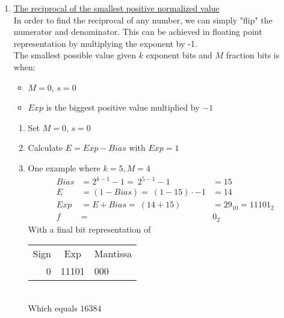 \documentclass{article}
\begin{document}
\begin{enumerate}[label=\Alph*)]
    \item \underline{The reciprocal of the smallest positive normalized value} \\ [\baselineskip]
    In order to find the reciprocal of any number, we can simply "flip" the numerator and denominator. This can be achieved in floating point representation by multiplying the exponent by -1. \\
    The smallest possible value given \(k\) exponent bits and \(M\) fraction bits is when:
    \begin{itemize}[label=\(\square\)]
        \item \(M = 0\), \(s = 0\)
        \item \(Exp\) is the biggest positive value multiplied by \(-1\)
    \end{itemize}
    \begin{enumerate}[label=\arabic*.]
        \item Set \(M =0\), \(s = 0\)
        \item Calculate \(E = Exp - Bias\) with \(Exp = 1\)
        \item One example where \(k = 5, M = 4\)
        \begin{align*}
            Bias &= 2^{k-1} - 1 =\ 2^{5-1} - 1 &= 15 \\
            E &= (1 - Bias) =\ (1 - 15) \cdot -1 &= 14 \\
            Exp &= E + Bias =\ (14 + 15) &= 29_{10} = 11101_2 \\
            f &=& 0_2
        \end{align*}
        With a final bit representation of
        \begin{tabular}{r|c|l}
            Sign & Exp & Mantissa \\
            0 & 11101 & 000 \\
        \end{tabular} \\
        Which equals \(16384\)
    \end{enumerate}

\end{enumerate}
\end{document}
